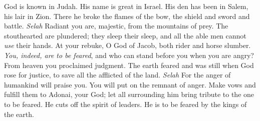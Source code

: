 \begin{biblechapter} %
 God is known in Judah. 
His name is great in Israel.
\verse His den has been in Salem, 
his lair in Zion.
\verse There he broke the flames of the bow, 
the shield and sword and battle. \textit{Selah}
\verse Radiant you are, majestic, 
from the mountains of prey.
\verse The stouthearted are plundered; 
they sleep their sleep, 
and all the able men cannot \textit{use} their hands.
\verse At your rebuke, O God of Jacob, 
both rider and horse slumber.
\verse \textit{You, indeed, are to be feared}, 
and who can stand before you 
when you are angry? 
\verse From heaven you proclaimed judgment. 
The earth feared and was still
\verse when God rose for justice, 
to save all the afflicted of the land. \textit{Selah}
\verse For the anger of humankind will praise you. 
You will put on the remnant of anger.
\verse Make vows and fulfill them to Adonai, your God; 
let all surrounding him 
bring tribute to the one to be feared.
\verse He cuts off the spirit of leaders. 
He is to be feared by the kings of the earth.
\end{biblechapter}

